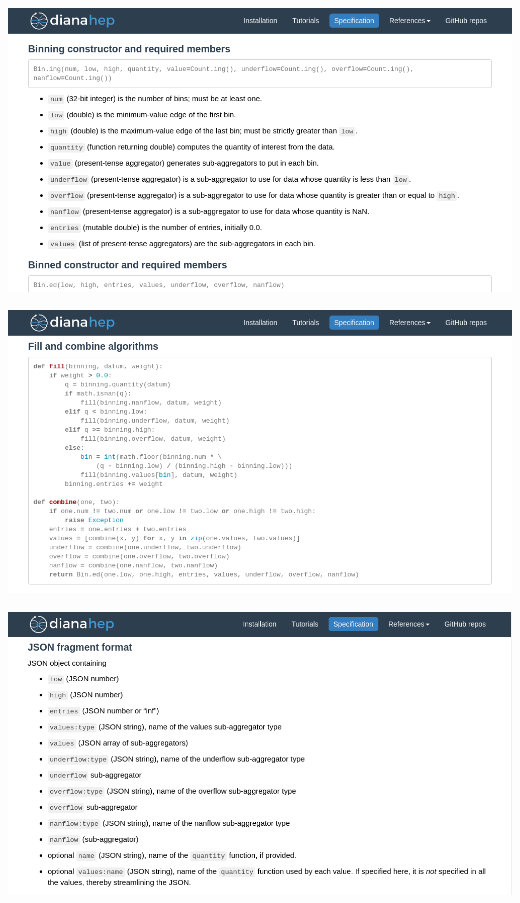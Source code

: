 \documentclass[aspectratio=169]{beamer}
\begin{document}
\begin{frame}{}
\hspace{-1 cm}\mbox{\includegraphics[width=16 cm]{spec2.png}\hspace{-5 cm}}
\end{frame}

\begin{frame}{}
\hspace{-1 cm}\mbox{\includegraphics[width=16 cm]{spec3.png}\hspace{-5 cm}}
\end{frame}

\begin{frame}{}
\hspace{-1 cm}\mbox{\includegraphics[width=16 cm]{spec4.png}\hspace{-5 cm}}
\end{frame}
\end{document}

